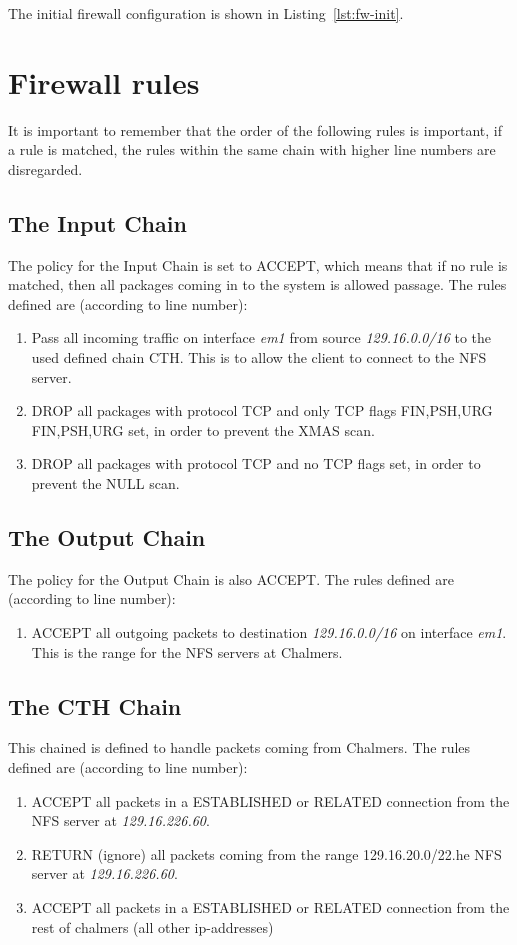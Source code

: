 \documentclass[a4paper,12pt]{report}
\begin{document}
The initial firewall configuration is shown in Listing~\ref{lst:fw-init}.
\section{Firewall rules}
It is important to remember that the order of the following rules is important, if a rule is matched, the rules within the same chain with higher line numbers are disregarded.
\subsection{The Input Chain}
The policy for the Input Chain is set to ACCEPT, which means that if no rule is matched, then all packages coming in to the system is allowed passage.
The rules defined are (according to line number):
\begin{enumerate}
    \item Pass all incoming traffic on interface \emph{em1} from source \emph{129.16.0.0/16} to the used defined chain CTH. This is to allow the client to connect to the NFS server.
    \item DROP all packages with protocol TCP and only TCP flags FIN,PSH,URG FIN,PSH,URG set, in order to prevent the XMAS scan.
    \item DROP all packages with protocol TCP and no TCP flags set, in order to prevent the NULL scan.
\end{enumerate}

\subsection{The Output Chain}
The policy for the Output Chain is also ACCEPT. The rules defined are (according to line number):
\begin{enumerate}
    \item ACCEPT all outgoing packets to destination \emph{129.16.0.0/16} on interface \emph{em1}. This is the range for the NFS servers at Chalmers.
\end{enumerate}

\subsection{The CTH Chain}
This chained is defined to handle packets coming from Chalmers. The rules defined are (according to line number):
\begin{enumerate}
    \item ACCEPT all packets in a ESTABLISHED or RELATED connection from the NFS server at \emph{129.16.226.60}.
    \item RETURN (ignore) all packets coming from the range 129.16.20.0/22.he NFS server at \emph{129.16.226.60}.
    \item ACCEPT all packets in a ESTABLISHED or RELATED connection from the rest of chalmers (all other ip-addresses)
\end{enumerate}
\end{document}
